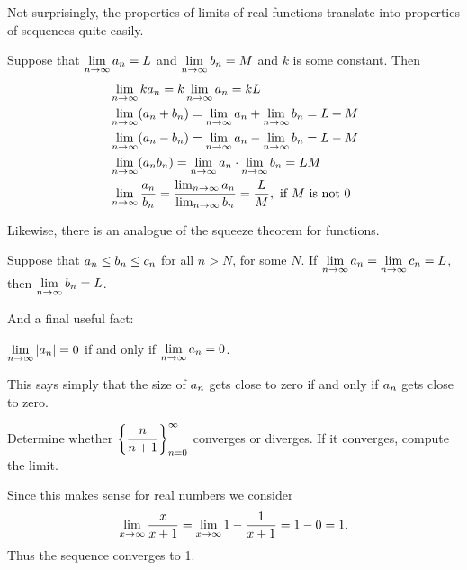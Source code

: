 Not surprisingly, the properties of limits of real functions translate
into properties of sequences quite easily. 

\begin{theorem} \relax\label{thm:properties of sequences}
Suppose that $\displaystyle\lim_{n\to\infty}a_n=L$ and 
$\displaystyle\lim_{n\to\infty}b_n=M$ and
$k$ is some constant. Then
\begin{align*}
&\lim_{n\to\infty} ka_n = k\lim_{n\to\infty}a_n=kL \\
&\lim_{n\to\infty} (a_n+b_n) = \lim_{n\to\infty}a_n+\lim_{n\to\infty}b_n=L+M \\
&\lim_{n\to\infty} (a_n-b_n) = \lim_{n\to\infty}a_n-\lim_{n\to\infty}b_n=L-M \\
&\lim_{n\to\infty} (a_nb_n) = \lim_{n\to\infty}a_n\cdot\lim_{n\to\infty}b_n=LM \\
&\lim_{n\to\infty} {a_n\over b_n} = {\lim_{n\to\infty}a_n\over
  \lim_{n\to\infty}b_n}={L\over M},\hbox{ if $M$ is not 0} \\
\end{align*}
\end{theorem}

Likewise, there is an analogue of the squeeze theorem for functions.

\begin{theorem}\relax\label{thm:squeeze theorem for sequences}
Suppose that $\displaystyle a_n \le b_n \le c_n$ for all $n>N$, for some $N$.
If $\displaystyle\lim_{n\to\infty}a_n=\displaystyle\lim_{n\to\infty}c_n=L$, 
then $\displaystyle\lim_{n\to\infty}b_n=L$.
\end{theorem}

And a final useful fact:

\begin{theorem} \relax\label{thm:absolute value sequence}
$\displaystyle\lim_{n\to\infty}|a_n|=0$ if and only if
$\displaystyle\lim_{n\to\infty}a_n=0$.
\end{theorem}

This says simply that the size of $\displaystyle a_n$ gets close to zero if and
only if $\displaystyle a_n$ gets close to zero.

\begin{example}
Determine whether $\displaystyle\left\{{n\over n+1}\right\}_{n=0}^\infty$ converges or
diverges. If it converges, compute the limit.
\end{example}

\begin{solution}
Since this makes sense for real numbers we consider
$$
\lim_{x\to\infty}{x\over x+1}=\lim_{x\to\infty}1-{1\over x+1}=1-0=1.
$$
Thus the sequence converges to 1.
\end{solution}

